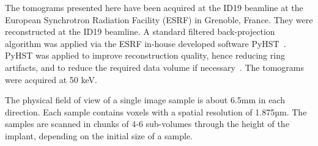 The tomograms presented here have been acquired at the ID19 beamline at the
European Synchrotron Radiation Facility (ESRF) in Grenoble, France. They were
reconstructed\citep{sporring} at the ID19 beamline. A standard filtered
back-projection algorithm was applied via the ESRF in-house developed software
PyHST~\citep{NELDAM2015682,pyhst}. PyHST was applied to improve reconstruction
quality, hence reducing ring artifacts, and to reduce the required data volume
if necessary~\cite{MIRONE201441}. The tomograms were acquired at 50 keV.

The physical field of view of a single image sample is about 6.5mm in each
direction. Each sample contains voxels with a spatial resolution of 1.875µm.
The samples are scanned in chunks of 4-6 sub-volumes through the height of the
implant, depending on the initial size of a sample.

